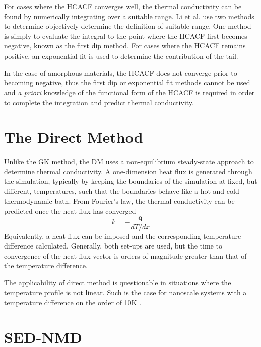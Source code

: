 \documentclass[aps,prb,preprint,preprintnumbers,amsmath,amssymb,floatfix,superscriptaddress]{revtex4}
\begin{document}
For cases where the HCACF converges well, the thermal conductivity can be found by numerically integrating over a suitable range. Li et al. \cite{Li1998139} use two methods to determine objectively determine the definition of suitable range. One method is simply to evaluate the integral to the point where the HCACF first becomes negative, known as the first dip method. For cases where the HCACF remains positive, an exponential fit is used to determine the contribution of the tail.

In the case of amorphous materials, the HCACF does not converge prior to becoming negative, thus the first dip or exponential fit methods cannot be used and \textit{a priori} knowledge of the functional form of the HCACF is required in order to complete the integration and predict thermal conductivity.

\section*{The Direct Method}

Unlike the GK method, the DM uses a non-equilibrium steady-state approach to determine thermal conductivity. A one-dimension heat flux is generated through the simulation, typically by keeping the boundaries of the simulation at fixed, but different, temperatures, such that the boundaries behave like a hot and cold thermodynamic bath. From Fourier's law, the thermal conductivity can be predicted once the heat flux has converged
%
\begin{equation}
k=-\frac{\pmb{q}}{dT/dx}
\end{equation}
%
Equivalently, a heat flux can be imposed and the corresponding temperature difference calculated. Generally, both set-ups are used, but the time to convergence of the heat flux vector is orders of magnitude greater than that of the temperature difference.

The applicability of direct method is questionable in situations where the temperature profile is not linear. Such is the case for nanoscale systems with a temperature difference on the order of 10K \cite{mcgaugheythesis}.

\section*{SED-NMD}
\end{document}
